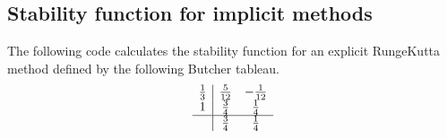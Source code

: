 \documentclass[letterpaper,10pt,english]{jupyterBook}
\begin{document}
\subsection{Stability function for implicit methods}
\label{\detokenize{8_Appendices/8.1_Python:stability-function-for-implicit-methods}}
\sphinxAtStartPar
The following code calculates the stability function for an explicit Runge\sphinxhyphen{}Kutta method defined by the following Butcher tableau.
\begin{align*}
    \begin{array}{c|cc}
    \frac{1}{3} & \frac{5}{12} & -\frac{1}{12} \\
    1 & \frac{3}{4} & \frac{1}{4} \\ \hline
    & \frac{3}{4} & \frac{1}{4}
    \end{array}
\end{align*}
\end{document}
